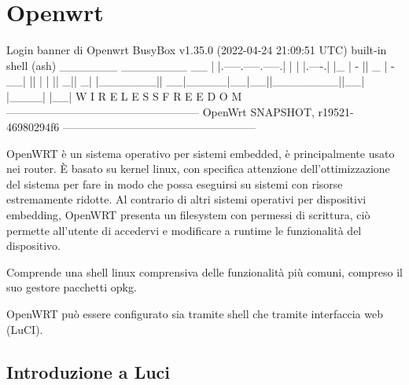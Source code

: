 


\section{Openwrt}

\begin{bashcode}{Login banner di Openwrt}{}
BusyBox v1.35.0 (2022-04-24 21:09:51 UTC) built-in shell (ash)
    _______                     ________        __
    |       |.-----.-----.-----.|  |  |  |.----.|  |_
    |   -   ||  _  |  -__|     ||  |  |  ||   _||   _|
    |_______||   __|_____|__|__||________||__|  |____|
            |__| W I R E L E S S   F R E E D O M
    -----------------------------------------------------
    OpenWrt SNAPSHOT, r19521-46980294f6
    -----------------------------------------------------
\end{bashcode}

OpenWRT è un sistema operativo per sistemi embedded, è principalmente usato nei router. È basato su kernel linux, con specifica attenzione dell'ottimizzazione del sistema per fare in modo che possa eseguirsi su sistemi con risorse estremamente ridotte.
Al contrario di altri sistemi operativi per dispositivi embedding, OpenWRT presenta un filesystem con permessi di scrittura, ciò permette all'utente di accedervi e modificare a runtime le funzionalità del dispositivo.

Comprende una shell linux comprensiva delle funzionalità più comuni, compreso il suo gestore pacchetti opkg.

OpenWRT può essere configurato sia tramite shell che tramite interfaccia web (LuCI).


\subsection{Introduzione a Luci}


